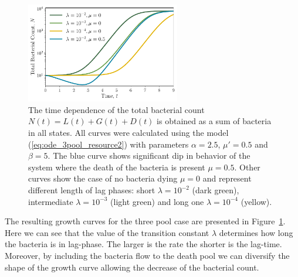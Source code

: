 \documentclass[10pt,A4paper]{article}
\numberwithin{equation}{section}
\begin{document}
\begin{figure}[h]
    \begin{center}
    \includegraphics[width=0.6\textwidth]{Figures/pool_model_3pools_resource.pdf}
    \caption{
        The time dependence of the total bacterial count $N(t) = L(t) + G(t) + D(t)$ is obtained as a sum of bacteria in all states.
        All curves were calculated using the model (\ref{eq:ode_3pool_resource2}) with parameters $\alpha=2.5$, $\mu'=0.5$ and $\beta=5$.
        The blue curve shows significant dip in behavior of the system where the death of the bacteria is present $\mu = 0.5$.
        Other curves show the case of no bacteria dying $\mu=0$ and represent different length of lag phases:
        short $\lambda=10^{-2}$ (dark green), intermediate $\lambda=10^{-3}$ (light green) and long one $\lambda=10^{-4}$ (yellow).
    }
    \label{fig:3pool_resource_plots}
    \end{center}
\end{figure}
The resulting growth curves for the three pool case are presented in Figure~\ref{fig:3pool_resource_plots}.
Here we can see that the value of the transition constant $\lambda$ determines how long the bacteria is in lag-phase.
The larger is the rate the shorter is the lag-time.
Moreover, by including the bacteria flow to the death pool we can diversify the shape of the growth curve allowing the decrease of the bacterial count.
%
%
%
\end{document}
